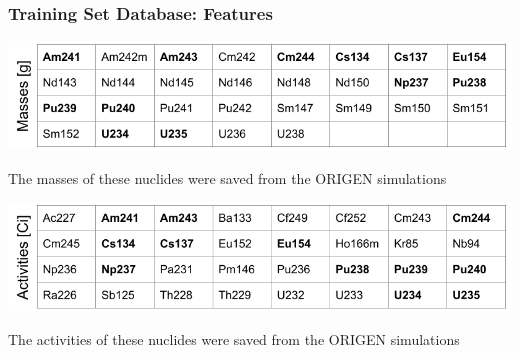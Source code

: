 \begin{frame}
  \frametitle{Training Set Database: Features}
    \begin{table}
      \centering
      \includegraphics[width=\linewidth]{./figures/nuclist_featureset_masses.png}
      \caption{The masses of these nuclides were saved from the ORIGEN simulations}
    \end{table}
    \begin{table}
      \centering
      \includegraphics[width=\linewidth]{./figures/nuclist_featureset_activities.png}
      \caption{The activities of these nuclides were saved from the ORIGEN simulations}
    \end{table}
\end{frame}


